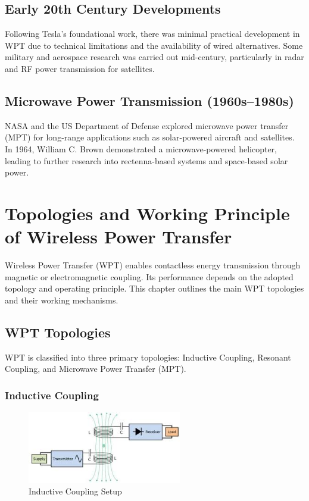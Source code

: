 \documentclass[12pt,a4paper]{report}
\begin{document}
 \section{Early 20th Century Developments}
 \quad Following Tesla's foundational work, there was minimal practical development in WPT due to technical limitations and the availability of wired alternatives. Some military and aerospace research was carried out mid-century, particularly in radar and RF power transmission for satellites.
 \section{ Microwave Power Transmission (1960s–1980s)}
 \quad NASA and the US Department of Defense explored microwave power transfer (MPT) for long-range applications such as solar-powered aircraft and satellites. In 1964, William C. Brown demonstrated a microwave-powered helicopter, leading to further research into rectenna-based systems and space-based solar power.\cite{zhou2025lowpower}\cite{erickson2020resonant}
 


\chapter{Topologies and Working Principle of Wireless Power Transfer}
\vspace{1cm}

\quad Wireless Power Transfer (WPT) enables contactless energy transmission through magnetic or electromagnetic coupling. Its performance depends on the adopted topology and operating principle. This chapter outlines the main WPT topologies and their working mechanisms.

\section{WPT Topologies}

\quad WPT is classified into three primary topologies: Inductive Coupling, Resonant Coupling, and Microwave Power Transfer (MPT).

\subsection{Inductive Coupling}
\begin{figure}[H]
    \centering
    \includegraphics[width=0.6\textwidth]{image1.png}
    \caption{Inductive Coupling Setup}
\end{figure}
\end{document}
